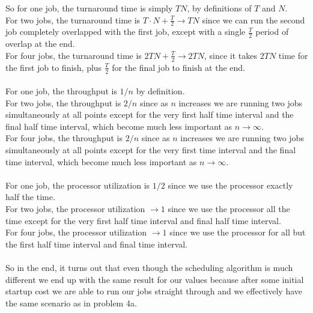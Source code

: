 \documentclass[12pt]{article}
\begin{document}
\noindent So for one job, the turnaround time is simply $TN$, by definitions of $T$ and $N$.\\
For two jobs, the turnaround time is $T \cdot N + \frac{T}{2} \rightarrow TN$ since we can run the second job completely overlapped with the first job, except with a single $\frac{T}{2}$ period of overlap at the end.\\
For four jobs, the turnaround time is $2TN  + \frac{T}{2} \rightarrow 2TN$, since it takes $2TN$ time for the first job to finish, plus $\frac{T}{2}$ for the final job to finish at the end.\\
\\
For one job, the throughput is $1/n$ by definition.\\
For two jobs, the throughput is $2/n$ since as $n$ increases we are running two jobs simultaneously at all points except for the very first half time interval and the final half time interval, which become much less important as $n \rightarrow \infty $.\\
For four jobs, the throughput is $2/n$ since as $n$ increases we are running two jobs simultaneously at all points except for the very first time interval and the final time interval, which become much less important as $n \rightarrow \infty$.\\
\\
For one job, the processor utilization is $1/2$ since we use the processor exactly half the time.\\
For two jobs, the processor utilization $\rightarrow 1$ since we use the processor all the time except for the very first half time interval and final half time interval.\\
For four jobs, the processor utilization $\rightarrow 1$ since we use the processor for all but the first half time interval and final time interval. \\
\\
So in the end, it turns out that even though the scheduling algorithm is much different we end up with the same result for our values because after some initial startup cost we are able to run our jobs straight through and we effectively have the same scenario as in problem 4a.
\end{document}
